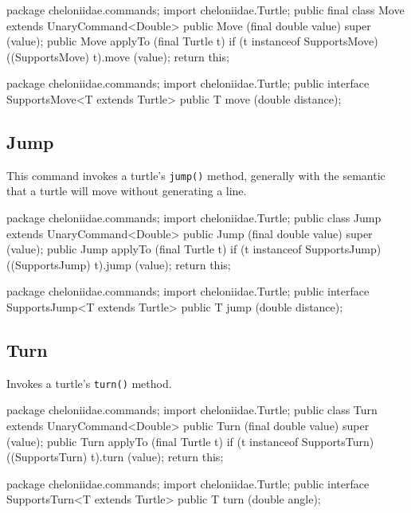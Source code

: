 \documentclass{report}
\begin{document}
\begin{javacode}
package cheloniidae.commands;
import cheloniidae.Turtle;
public final class Move extends UnaryCommand<Double> {
  public Move (final double value) {super (value);}
  public Move applyTo (final Turtle t) {
    if (t instanceof SupportsMove) ((SupportsMove) t).move (value);
    return this;
  }
}
\end{javacode}

\begin{javacode}
package cheloniidae.commands;
import cheloniidae.Turtle;
public interface SupportsMove<T extends Turtle> {
  public T move (double distance);
}
\end{javacode}

\subsection {Jump} \label{sec:jump}
        This command invokes a turtle's {\tt jump()} method, generally with the semantic that a turtle will move without generating a line.

\begin{javacode}
package cheloniidae.commands;
import cheloniidae.Turtle;
public class Jump extends UnaryCommand<Double> {
  public Jump (final double value) {super (value);}
  public Jump applyTo (final Turtle t) {
    if (t instanceof SupportsJump) ((SupportsJump) t).jump (value);
    return this;
  }
}
\end{javacode}

\begin{javacode}
package cheloniidae.commands;
import cheloniidae.Turtle;
public interface SupportsJump<T extends Turtle> {
  public T jump (double distance);
}
\end{javacode}

\subsection {Turn} \label{sec:turn}
        Invokes a turtle's {\tt turn()} method.

\begin{javacode}
package cheloniidae.commands;
import cheloniidae.Turtle;
public class Turn extends UnaryCommand<Double> {
  public Turn (final double value) {super (value);}
  public Turn applyTo (final Turtle t) {
    if (t instanceof SupportsTurn) ((SupportsTurn) t).turn (value);
    return this;
  }
}
\end{javacode}

\begin{javacode}
package cheloniidae.commands;
import cheloniidae.Turtle;
public interface SupportsTurn<T extends Turtle> {
  public T turn (double angle);
}
\end{javacode}
\end{document}
